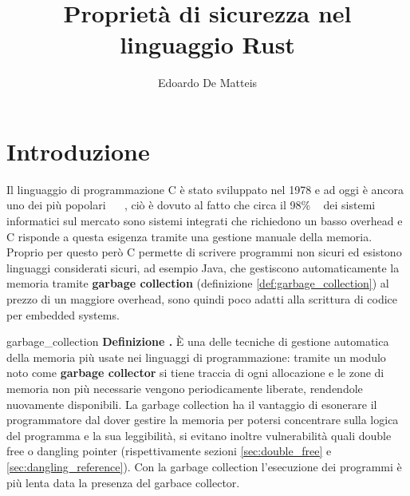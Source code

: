 \documentclass[Lau,binding=0.6cm]{sapthesis}
\title{Proprietà di sicurezza nel linguaggio Rust}
\author{Edoardo De Matteis}
\newenvironment{myDefinition}[2]{ \begin{Definizione}[adjusted title=#1]{}{#2}
    \textbf{Definizione \thetcbcounter.} }{\end{Definizione}}
\begin{document}
\frontmatter

\maketitle




\tableofcontents


\mainmatter

\chapter{Introduzione}

Il linguaggio di programmazione C è stato sviluppato nel 1978 e ad oggi è ancora uno dei più popolari ~\cite{tiobe:index} ~\cite{pypl:index}, ciò è dovuto al fatto che circa il 98\% ~\cite{real_men_program_in_c} dei sistemi informatici sul mercato sono sistemi integrati che richiedono un basso overhead e C risponde a questa esigenza tramite una gestione manuale della memoria. Proprio per questo però C permette di scrivere programmi non sicuri ed esistono linguaggi considerati sicuri, ad esempio Java, che gestiscono automaticamente la memoria tramite \textbf{garbage collection} (definizione \ref{def:garbage_collection}) al prezzo di un maggiore overhead, sono quindi poco adatti alla scrittura di codice per embedded systems.

\begin{myDefinition}{Garbage collection}{garbage_collection}
    È una delle tecniche di gestione automatica della memoria più usate nei linguaggi di programmazione: tramite un modulo noto come \textbf{garbage collector} si tiene traccia di ogni allocazione e le zone di memoria non più necessarie vengono periodicamente liberate, rendendole nuovamente disponibili. 
    La garbage collection ha il vantaggio di esonerare il programmatore dal dover gestire la memoria per potersi concentrare sulla logica del programma e la sua leggibilità, si evitano inoltre vulnerabilità quali double free o dangling pointer (rispettivamente sezioni \ref{sec:double_free} e \ref{sec:dangling_reference}). 
    Con la garbage collection l'esecuzione dei programmi è più lenta data la presenza del garbace collector.
\end{myDefinition}
\end{document}
